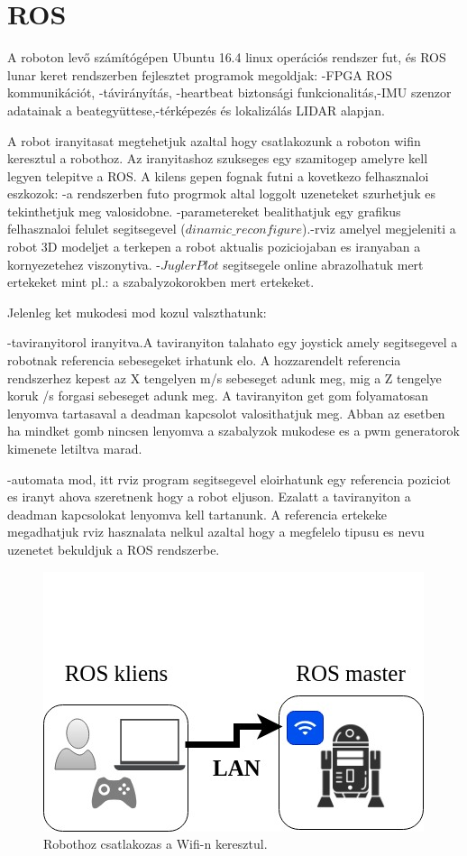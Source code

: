 \section{ROS}

A roboton levő számítógépen Ubuntu 16.4 linux operációs rendszer fut, és ROS lunar keret rendszerben fejlesztet programok megoldjak:
-FPGA ROS kommunikációt, -távirányítás, -heartbeat biztonsági funkcionalitás,-IMU szenzor adatainak a beategyüttese,-térképezés és lokalizálás LIDAR alapjan.

A robot iranyitasat megtehetjuk azaltal hogy csatlakozunk a roboton wifin keresztul a robothoz. Az iranyitashoz szukseges egy szamitogep amelyre kell legyen telepitve a ROS. A kilens gepen fognak futni a kovetkezo felhasznaloi eszkozok:
-a rendszerben futo progrmok altal loggolt uzeneteket szurhetjuk es tekinthetjuk meg valosidobne.
-parametereket bealithatjuk egy grafikus felhasznaloi felulet segitsegevel ($dinamic\_reconfigure$).-rviz amelyel megjeleniti a robot 3D modeljet a terkepen a robot aktualis poziciojaban es iranyaban a kornyezetehez viszonytiva.
-$JuglerPlot$ segitsegele online abrazolhatuk mert ertekeket mint pl.: a szabalyzokorokben mert ertekeket.

Jelenleg ket mukodesi mod kozul valszthatunk:

	-taviranyitorol iranyitva.A taviranyiton talahato egy joystick amely segitsegevel a robotnak referencia sebesegeket irhatunk elo. A hozzarendelt referencia rendszerhez kepest az X tengelyen m/s sebeseget adunk meg, mig a Z tengelye koruk \degree/s forgasi sebeseget adunk meg.
A taviranyiton get gom folyamatosan lenyomva tartasaval a deadman kapcsolot valosithatjuk meg. Abban az esetben ha mindket gomb nincsen lenyomva a szabalyzok mukodese es a pwm generatorok kimenete letiltva marad.

	-automata mod, itt rviz program segitsegevel eloirhatunk egy referencia poziciot es iranyt ahova szeretnenk hogy a robot eljuson. Ezalatt a taviranyiton a deadman kapcsolokat lenyomva kell tartanunk. A referencia ertekeke megadhatjuk rviz hasznalata nelkul azaltal hogy a megfelelo tipusu es nevu uzenetet bekuldjuk a ROS rendszerbe.



\begin{figure}[H]
  \includegraphics{tikz/RobotUserLan.jpg}
  \caption{Robothoz csatlakozas a Wifi-n keresztul.}
  \label{fig:RobotUserLan}
\end{figure}


